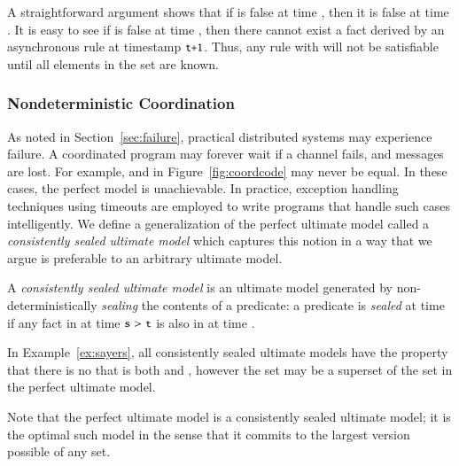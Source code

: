 A straightforward argument shows that if  is false at time , then it is false at time .  It is easy to see if  is false at time , then there cannot exist a  fact derived by an asynchronous rule at timestamp $\dedalus{t+1}$.  Thus, any rule with  will not be satisfiable until all elements in the  set are known.


\subsubsection{Nondeterministic Coordination}
As noted in Section~\ref{sec:failure}, practical distributed systems may experience failure.  A coordinated program may forever wait if a channel fails, and messages are lost.  For example,  and  in Figure~\ref{fig:coordcode} may never be equal.  In these cases, the perfect model is unachievable.  In practice, exception handling techniques using timeouts are employed to write programs that handle such cases intelligently.  We define a generalization of the perfect ultimate model called a {\em consistently sealed ultimate model} which captures this notion in a way that we argue is preferable to an arbitrary ultimate model.

\begin{definition}
A {\em consistently sealed ultimate model} is an ultimate model generated by non-deterministically {\em sealing} the contents of a predicate: a predicate  is {\em sealed} at time  if any fact in  at time $\dedalus{s} > \dedalus{t}$ is also in  at time .
\end{definition}

In Example~\ref{ex:sayers}, all consistently sealed ultimate models have the property that there is no  that is both  and , however the  set may be a superset of the  set in the perfect ultimate model.  

Note that the perfect ultimate model is a consistently sealed ultimate model; it is the optimal such model in the sense that it commits to the largest version possible of any set.


